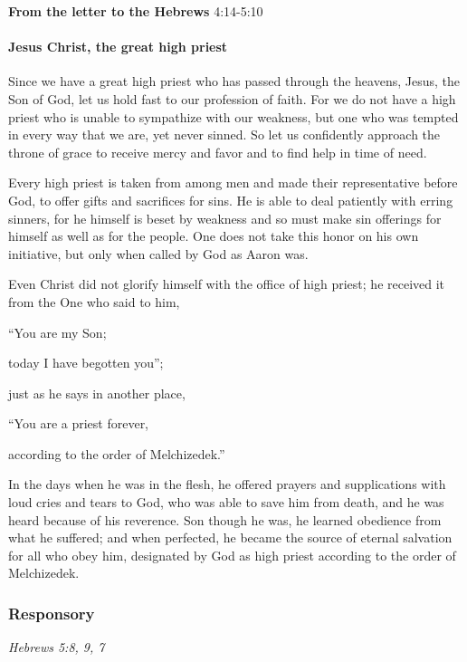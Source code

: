 \textbf{From the letter to the Hebrews} \hfill 4:14-5:10

\paragraph{Jesus Christ, the great high priest}

\lettrine[lines=3]{S}{}ince we have a great high priest who has passed through the heavens, Jesus, the Son of God, let us hold fast to our profession of faith. For we do not have a high priest who is unable to sympathize with our weakness, but one who was tempted in every way that we are, yet never sinned. So let us confidently approach the throne of grace to receive mercy and favor and to find help in time of need.

Every high priest is taken from among men and made their representative before God, to offer gifts and sacrifices for sins. He is able to deal patiently with erring sinners, for he himself is beset by weakness and so must make sin offerings for himself as well as for the people. One does not take this honor on his own initiative, but only when called by God as Aaron was.

Even Christ did not glorify himself with the office of high priest; he received it from the One who said to him,

\vspace{5pt}
   “You are my Son; \par
      today I have begotten you”;

\vspace{5pt}

just as he says in another place,

\vspace{5pt}

   “You are a priest forever,\par
      according to the order of Melchizedek.”

\vspace{5pt}

In the days when he was in the flesh, he offered prayers and supplications with loud cries and tears to God, who was able to save him from death, and he was heard because of his reverence. Son though he was, he learned obedience from what he suffered; and when perfected, he became the source of eternal salvation for all who obey him, designated by God as high priest according to the order of Melchizedek.

\subsubsection{Responsory}
\hfill \emph{Hebrews 5:8, 9, 7}

